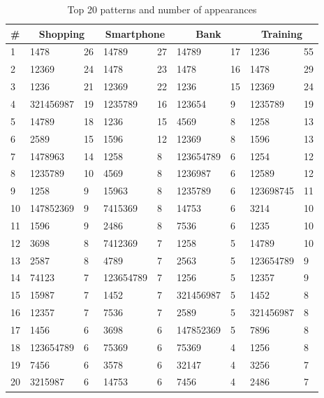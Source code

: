 {{    %
    \begin{table}[H]
	    \centering
	    \begin{tabular}{l || l l | l l | l l | l l }
	      \hline
	      {\bf \#} & \multicolumn{2}{c|}{\bf Shopping} & \multicolumn{2}{c|}{\bf Smartphone} & \multicolumn{2}{c|}{\bf Bank} & \multicolumn{2}{c}{\bf Training} \\ \hline
	      1  & 1478      & 26 & 14789      & 27 & 14789      & 17 & 1236       & 55 \\ 
	      2  & 12369     & 24 & 1478       & 23 & 1478       & 16 & 1478       & 29 \\
	      3  & 1236      & 21 & 12369      & 22 & 1236       & 15 & 12369      & 24 \\
	      4  & 321456987 & 19 & 1235789    & 16 & 123654     & 9  & 1235789    & 19 \\
	      5  & 14789     & 18 & 1236       & 15 & 4569       & 8  & 1258       & 13 \\
	      6  & 2589      & 15 & 1596       & 12 & 12369      & 8  & 1596       & 13 \\
	      7  & 1478963   & 14 & 1258       & 8  & 123654789  & 6  & 1254       & 12 \\
	      8  & 1235789   & 10 & 4569       & 8  & 1236987    & 6  & 12589      & 12 \\
	      9  & 1258      & 9  & 15963      & 8  & 1235789    & 6  & 123698745  & 11 \\
	      10 & 147852369 & 9  & 7415369    & 8  & 14753      & 6  & 3214       & 10 \\
	      11 & 1596      & 9  & 2486       & 8  & 7536       & 6  & 1235       & 10 \\
	      12 & 3698      & 8  & 7412369    & 7  & 1258       & 5  & 14789      & 10 \\
	      13 & 2587      & 8  & 4789       & 7  & 2563       & 5  & 123654789  & 9  \\
	      14 & 74123     & 7  & 123654789  & 7  & 1256       & 5  & 12357      & 9  \\
	      15 & 15987     & 7  & 1452       & 7  & 321456987  & 5  & 1452       & 8  \\
	      16 & 12357     & 7  & 7536       & 7  & 2589       & 5  & 321456987  & 8  \\
	      17 & 1456      & 6  & 3698       & 6  & 147852369  & 5  & 7896       & 8  \\
	      18 & 123654789 & 6  & 75369      & 6  & 75369      & 4  & 1256       & 8  \\
	      19 & 7456      & 6  & 3578       & 6  & 32147      & 4  & 3256       & 7  \\
	      20 & 3215987   & 6  & 14753      & 6  & 7456       & 4  & 2486       & 7  \\ \hline
	    \end{tabular}
	    \caption{Top 20 patterns and number of appearances}
	    \label{tab:top20}
  	\end{table}

}}
